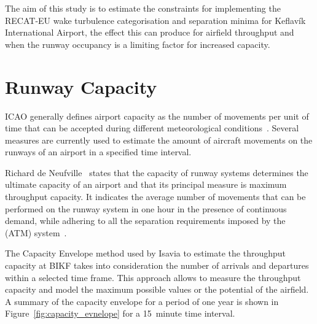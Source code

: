 The aim of this study is to estimate the constraints for implementing the RECAT-EU wake turbulence categorisation and separation minima for Keflavík International Airport, the effect this can produce for airfield throughput and when the runway occupancy is a limiting factor for increased capacity.

\section{Runway Capacity\label{sec:runway_capacity}}

ICAO generally defines airport capacity as the number of movements per unit of time that can be accepted during different meteorological conditions~\cite{airport_capacity_methodology}. 
Several measures are currently used to estimate the amount of aircraft movements on the runways of an airport in a specified time interval.

Richard de Neufville~\cite{de_neufville_airport_2013} states that the capacity of runway systems determines the ultimate capacity of an airport and that its principal measure is maximum throughput capacity. It indicates the average number of movements that can be performed on the runway system in one hour in the presence of continuous demand, while adhering to all the separation requirements imposed by the (ATM) system~\cite{de_neufville_airport_2013}.

The Capacity Envelope method used by Isavia to estimate the throughput capacity at BIKF takes into consideration the number of arrivals and departures within a selected time frame. This approach allows to measure the throughput capacity and model the maximum possible values or the potential of the airfield. A summary of the capacity envelope for a period of one year is shown in Figure~\ref{fig:capacity_evnelope} for a 15~minute time interval. 

